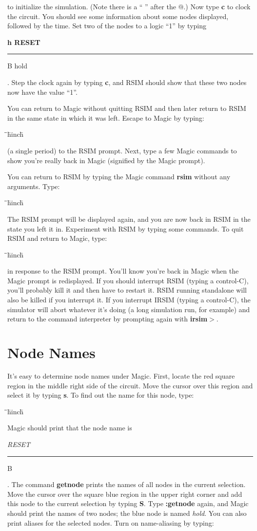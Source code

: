 \documentclass[letterpaper,twoside,12pt]{article}
\def\hinch{\hspace*{0.5in}}
\def\starti{\begin{center}\begin{tabbing}\hinch\=\hinch\=\hinch\=hinch\hinch\=\kill}
\def\endi{\end{tabbing}\end{center}}
\def\ii{\>\>\>}
\def\_{\rule{0.6em}{0.5pt}}
\begin{document}
to initialize the simulation.  (Note there is a `` '' after the @.)  Now type 
{\bfseries c} to clock the circuit.  You should see some information about
some nodes displayed, followed by the time.  Set two of the nodes
to a logic ``1'' by typing {\bfseries h RESET{\_}B hold}.  Step the clock again
by typing {\bfseries c}, and RSIM should show that these two nodes now have the
value ``1''.

You can return to Magic without quitting RSIM and then later return to 
RSIM in the same state in which it was left.  Escape to Magic by typing:

\starti
   \ii {\bfseries  . }
\endi

(a single period) to the RSIM prompt.  Next,
type a few Magic commands to show you're really back in Magic 
(signified by the Magic prompt).

You can return to RSIM by typing the Magic command {\bfseries rsim} without any
arguments. Type:

\starti
   \ii {\bfseries :rsim}
\endi

The RSIM prompt will be displayed again, and you are now back in RSIM 
in the state you left it in.  Experiment with RSIM by typing some 
commands.  To quit RSIM and return to Magic, type:

\starti
   \ii {\bfseries q}
\endi

in response to the RSIM prompt.  You'll know you're back in Magic when
the Magic prompt is redisplayed.  If you should interrupt RSIM 
(typing a control-C), you'll probably kill it and then have
to restart it.  RSIM running standalone will also be killed if you 
interrupt it.  If you interrupt IRSIM (typing a control-C), the simulator
will abort whatever it's doing (a long simulation run, for example) and
return to the command interpreter by prompting again with {\bfseries irsim$>$}.

\section{Node Names}

It's easy to determine node names under Magic.  First, locate the 
red square region in the middle right side of the circuit.  Move
the cursor over this region and select it by typing {\bfseries s}.  To find out
the name for this node, type:

\starti
   \ii {\bfseries :getnode}
\endi

Magic should print that the node name is {\itshape RESET{\_}B}.
The command {\bfseries getnode} prints the names of all nodes in the current
selection.  Move the cursor over the square blue region 
in the upper right corner and add this
node to the current selection by typing {\bfseries S}.  Type {\bfseries :getnode} again,
and Magic should print the names of two nodes; the blue node is named
{\itshape hold}.  You can also print aliases for the selected nodes.  
Turn on name-aliasing by typing:
\end{document}
